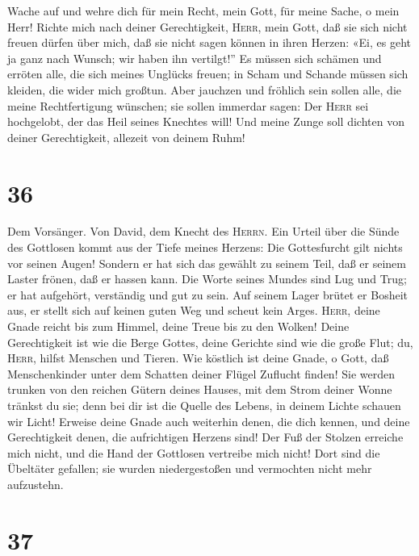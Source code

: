  Wache auf und wehre dich für mein Recht, mein Gott, für
meine Sache, o mein Herr!  Richte mich nach deiner
Gerechtigkeit, \textsc{Herr}, mein Gott, daß sie sich nicht freuen
dürfen über mich,  daß sie nicht sagen können in ihren
Herzen: «Ei, es geht ja ganz nach Wunsch; wir haben ihn vertilgt!''
 Es müssen sich schämen und erröten alle, die sich meines
Unglücks freuen; in Scham und Schande müssen sich kleiden, die wider
mich großtun.  Aber jauchzen und fröhlich sein sollen
alle, die meine Rechtfertigung wünschen; sie sollen immerdar sagen: Der
\textsc{Herr} sei hochgelobt, der das Heil seines Knechtes will!
 Und meine Zunge soll dichten von deiner Gerechtigkeit,
allezeit von deinem Ruhm!

\hypertarget{section-35}{%
\section{36}\label{section-35}}

 Dem Vorsänger. Von David, dem Knecht des \textsc{Herrn}.
Ein Urteil über die Sünde des Gottlosen kommt aus der Tiefe meines
Herzens: Die Gottesfurcht gilt nichts vor seinen Augen! 
Sondern er hat sich das gewählt zu seinem Teil, daß er seinem Laster
frönen, daß er hassen kann.  Die Worte seines Mundes sind
Lug und Trug; er hat aufgehört, verständig und gut zu sein.
 Auf seinem Lager brütet er Bosheit aus, er stellt sich
auf keinen guten Weg und scheut kein Arges. 
\textsc{Herr}, deine Gnade reicht bis zum Himmel, deine Treue bis zu den
Wolken!  Deine Gerechtigkeit ist wie die Berge Gottes,
deine Gerichte sind wie die große Flut; du, \textsc{Herr}, hilfst
Menschen und Tieren.  Wie köstlich ist deine Gnade, o
Gott, daß Menschenkinder unter dem Schatten deiner Flügel Zuflucht
finden!  Sie werden trunken von den reichen Gütern deines
Hauses, mit dem Strom deiner Wonne tränkst du sie;  denn
bei dir ist die Quelle des Lebens, in deinem Lichte schauen wir Licht!
 Erweise deine Gnade auch weiterhin denen, die dich
kennen, und deine Gerechtigkeit denen, die aufrichtigen Herzens sind!
 Der Fuß der Stolzen erreiche mich nicht, und die Hand
der Gottlosen vertreibe mich nicht!  Dort sind die
Übeltäter gefallen; sie wurden niedergestoßen und vermochten nicht mehr
aufzustehn.

\hypertarget{section-36}{%
\section{37}\label{section-36}}

